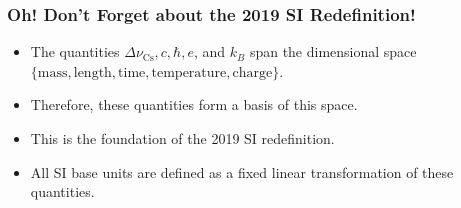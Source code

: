 \documentclass{beamer}
\begin{document}
\begin{frame}
    \frametitle{Oh! Don't Forget about the 2019 SI Redefinition!}
    \begin{itemize}
        \item<1-> The quantities $\Delta \nu_{\text{Cs}}, c, \hbar, e$, and $k_B$ span the dimensional space $\{\text{mass}, \text{length}, \text{time}, \text{temperature}, \text{charge}\}$.
        \item<2-> Therefore, these quantities form a basis of this space.
        \item<3-> This is the foundation of the 2019 SI redefinition.
        \item<4-> All SI base units are defined as a fixed linear transformation of these quantities. 
    \end{itemize}
\end{frame}
\end{document}

